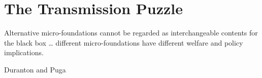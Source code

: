 




\chapter{The Transmission Puzzle} \label{chapter-tramsmission}%

\epigraph{Alternative micro-foundations cannot be regarded as interchangeable contents for the black box \dots %
different micro-foundations have different welfare and policy implications. %
}{Duranton and Puga \cite{durantonMicroFoundationsUrbanAgglomeration2004}}

